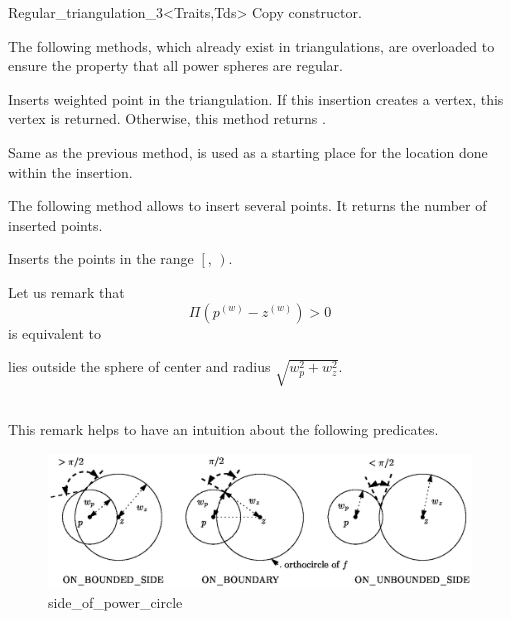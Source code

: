 \begin{ccClassTemplate}{Regular_triangulation_3<Traits,Tds>}
{Copy constructor.}

\ccModifiers


The following methods, which already exist in triangulations, are
overloaded to ensure the property that all power spheres are regular.

{Inserts weighted point  in the triangulation. If this
insertion creates a vertex, this vertex is returned. Otherwise, this
method returns .}

{Same as the previous method,  is used as a starting
place for the location done within the insertion.}

The following method allows to insert several points. It returns the
number of inserted points. 

{Inserts the points in the range $\left[\right.$,
$\left.\right)$. 
}


Let us remark that 
\[\Pi({p}^{(w)}-{z}^{(w)}) > 0\]
is equivalent to\\
\centerline{ lies outside the sphere of center  and radius
$\sqrt{w_p^2+w_z^2}$.}\\
This remark helps to have an intuition about the following predicates.

\begin{ccTexOnly}
\begin{figure}[htbp]
\begin{center} 
\includegraphics{sidedim2.eps} 
\end{center}
\caption{side\_of\_power\_circle \label{Triangulation3-fig-sidedim2}}
\end{figure} 
\end{ccTexOnly}


\end{ccClassTemplate}
